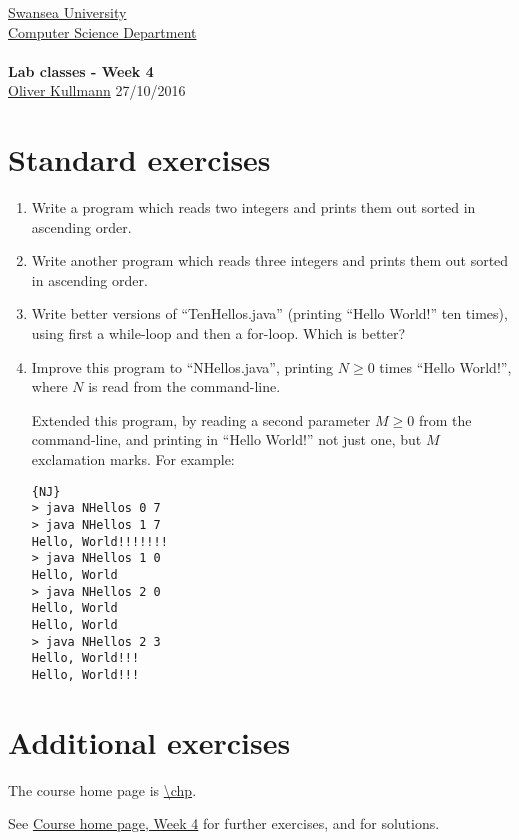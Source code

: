 \documentclass[11pt]{article}
\newcommand{\Java}{\lstset{language=Java,keywordstyle=\bfseries,breaklines,breakindent=30pt}}
\begin{document}
\begin{center}
  \href{http://www.swan.ac.uk/}{Swansea University}\\
  \href{http://www.swan.ac.uk/compsci/}{Computer Science Department}\\[1ex]
  \href{\chp}{\module}\\[1ex]
  \textbf{Lab classes - Week 4}\\
  \href{http://cs.swan.ac.uk/~csoliver}{Oliver Kullmann} 27/10/2016
\end{center}


\section{Standard exercises}
\label{sec:stdex}

\Java

\begin{enumerate}
\item Write a program which reads two integers and prints them out sorted in ascending order.
\item Write another program which reads three integers and prints them out sorted in ascending order.
\item Write better versions of ``TenHellos.java'' (printing ``Hello World!'' ten times), using first a while-loop and then a for-loop. Which is better?
\item Improve this program to ``NHellos.java'', printing $N \ge 0$ times ``Hello World!'', where $N$ is read from the command-line.

  Extended this program, by reading a second parameter $M \ge 0$ from the command-line, and printing in ``Hello World!'' not just one, but $M$ exclamation marks. For example:
  \begin{lstlisting}{NJ}
> java NHellos 0 7
> java NHellos 1 7
Hello, World!!!!!!!
> java NHellos 1 0
Hello, World
> java NHellos 2 0
Hello, World
Hello, World
> java NHellos 2 3
Hello, World!!!
Hello, World!!!
  \end{lstlisting}

\end{enumerate}


\section{Additional exercises}
\label{sec:addex}

The course home page is \url{\chp}.

See \href{\chp#ExercisesWeek04}{Course home page, Week 4} for further exercises, and for solutions.
\end{document}
